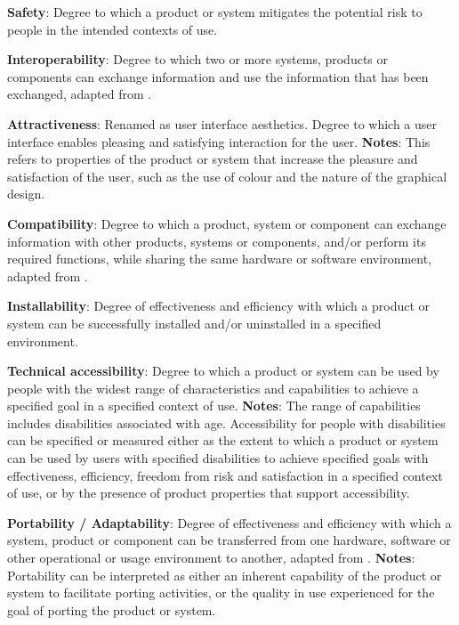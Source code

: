 \textbf{Safety}: Degree to which a product or system mitigates the potential risk to people in the intended contexts of use.

\textbf{Interoperability}: Degree to which two or more systems, products or components can exchange information and use the information that has been exchanged, adapted from \cite{iso_central_secretary_isoiecieee_2010}.

\textbf{Attractiveness}: Renamed as user interface aesthetics. Degree to which a user interface enables pleasing and satisfying interaction for the user. \textbf{Notes}: This refers to properties of the product or system that increase the pleasure and satisfaction of the user, such as the use of colour and the nature of the graphical design.

\textbf{Compatibility}: Degree to which a product, system or component can exchange information with other products, systems or components, and/or perform its required functions, while sharing the same hardware or software environment, adapted from \cite{iso_central_secretary_isoiecieee_2010}.

\textbf{Installability}: Degree of effectiveness and efficiency with which a product or system can be successfully installed and/or uninstalled in a specified environment.

\textbf{Technical accessibility}: Degree to which a product or system can be used by people with the widest range of characteristics and capabilities to achieve a specified goal in a specified context of use. \textbf{Notes}: The range of capabilities includes disabilities associated with age. Accessibility for people with disabilities can be specified or measured either as the extent to which a product or system can be used by users with specified disabilities to achieve specified goals with effectiveness, efficiency, freedom from risk and satisfaction in a specified context of use, or by the presence of product properties that support accessibility.

\textbf{Portability / Adaptability}: Degree of effectiveness and efficiency with which a system, product or component can be transferred from one hardware, software or other operational or usage environment to another, adapted from \cite{iso_central_secretary_isoiecieee_2010}. \textbf{Notes}: Portability can be interpreted as either an inherent capability of the product or system to facilitate porting activities, or the quality in use experienced for the goal of porting the product or system.

